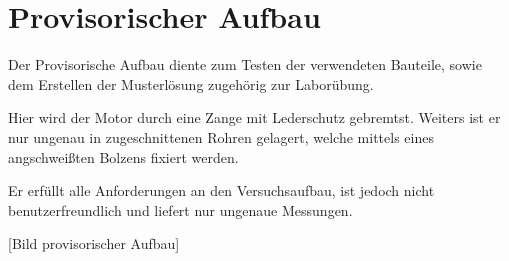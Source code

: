 \section{Provisorischer Aufbau}

Der Provisorische Aufbau diente zum Testen der verwendeten Bauteile, sowie dem Erstellen der Musterlösung zugehörig zur Laborübung.

Hier wird der Motor durch eine Zange mit Lederschutz gebremtst.
Weiters ist er nur ungenau in zugeschnittenen Rohren gelagert, welche mittels eines angschweißten Bolzens fixiert werden.

Er erfüllt alle Anforderungen an den Versuchsaufbau, ist jedoch nicht benutzerfreundlich und liefert nur ungenaue Messungen.

[Bild provisorischer Aufbau]